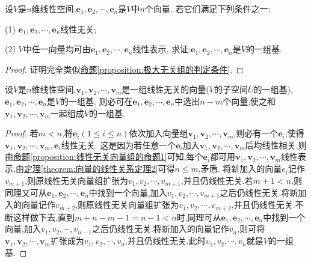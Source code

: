\documentclass[lang=cn,newtx,10pt,scheme=chinese]{elegantbook}
\begin{document}
\begin{proposition}
设\(V\)是\(n\)维线性空间,\(\boldsymbol{e}_1,\boldsymbol{e}_2,\cdots,\boldsymbol{e}_n\)是\(V\)中\(n\)个向量. 若它们满足下列条件之一:

(1) \(\boldsymbol{e}_1,\boldsymbol{e}_2,\cdots,\boldsymbol{e}_n\)线性无关;

(2) \(V\)中任一向量均可由\(\boldsymbol{e}_1,\boldsymbol{e}_2,\cdots,\boldsymbol{e}_n\)线性表示,
求证:\(\boldsymbol{e}_1,\boldsymbol{e}_2,\cdots,\boldsymbol{e}_n\)是\(V\)的一组基.
\end{proposition}
\begin{proof}
    证明完全类似\hyperref[proposition:极大无关组的判定条件]{命题\ref{proposition:极大无关组的判定条件}}.
\end{proof}

\begin{theorem}[基扩充定理]\label{theorem:基扩充定理}
设\(V\)是\(n\)维线性空间,\(\boldsymbol{v}_1,\boldsymbol{v}_2,\cdots,\boldsymbol{v}_m\)是一组线性无关的向量(\(V\)的子空间\(U\)的一组基),\(\boldsymbol{e}_1,\boldsymbol{e}_2,\cdots,\boldsymbol{e}_n\)是\(V\)的一组基. 则必可在\(\boldsymbol{e}_1,\boldsymbol{e}_2,\cdots,\boldsymbol{e}_n\)中选出\(n - m\)个向量,使之和\(\boldsymbol{v}_1,\boldsymbol{v}_2,\cdots,\boldsymbol{v}_m\)一起组成\(V\)的一组基.
\end{theorem}
\begin{proof}
    若\(m< n\),将\(\boldsymbol{e}_i(1\leq i\leq n)\)依次加入向量组\(\boldsymbol{v}_1,\boldsymbol{v}_2,\cdots,\boldsymbol{v}_m\),则必有一个\(\boldsymbol{e}_i\),使得\(\boldsymbol{v}_1,\boldsymbol{v}_2,\cdots,\boldsymbol{v}_m,\boldsymbol{e}_i\)线性无关. 这是因为若任意一个\(\boldsymbol{e}_i\)加入\(\boldsymbol{v}_1,\boldsymbol{v}_2,\cdots,\boldsymbol{v}_m\)后均线性相关,则由\hyperref[proposition:线性无关向量组的命题1]{命题\ref{proposition:线性无关向量组的命题1}}可知,每个\(\boldsymbol{e}_i\)都可用\(\boldsymbol{v}_1,\boldsymbol{v}_2,\cdots,\boldsymbol{v}_m\)线性表示,由\hyperref[theorem:向量的线性关系定理2]{定理\ref{theorem:向量的线性关系定理2}}可得\(n\leq m\),矛盾. 将新加入的向量$e_i$记作$v_{m+1}$,则原线性无关向量组扩张为$v_1,v_2,\cdots,v_{m+1}$,并且仍线性无关.若\(m + 1< n\),则同理又可从\(\boldsymbol{e}_1,\boldsymbol{e}_2,\cdots,\boldsymbol{e}_n\)中找到一个向量,加入$v_1,v_2,\cdots,v_{m+1}$之后仍线性无关.将新加入的向量记作$v_{m+2}$,则原线性无关向量组扩张为$v_1,v_2,\cdots,v_{m+2}$,并且仍线性无关.不断这样做下去,直到$m+n-m-1=n-1<n$时,同理可从\(\boldsymbol{e}_1,\boldsymbol{e}_2,\cdots,\boldsymbol{e}_n\)中找到一个向量,加入$v_1,v_2,\cdots,v_{n-1}$之后仍线性无关.将新加入的向量记作$v_{n}$,则可将\(\boldsymbol{v}_1,\boldsymbol{v}_2,\cdots,\boldsymbol{v}_m\)扩张成为$v_1,v_2,\cdots,v_{n}$,并且仍线性无关.此时$v_1,v_2,\cdots,v_{n}$就是\(V\)的一组基.
\end{proof}
\end{document}
